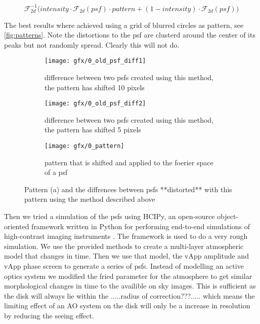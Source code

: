 \begin{equation}
\mathscr{F}_{2d}^{-1} \Big( intensity \cdot \mathscr{F}_{2d}(psf) \cdot pattern + (1-intensity) \cdot \mathscr{F}_{2d}(psf) \Big)
\end{equation}

The best results where achieved using a grid of blurred circles as pattern, see \autoref{fig:patterns}. Note the distortions to the psf are clusterd around the center of its peaks but not randomly spread. Clearly this will not do.

\begin{figure}[h!]
      \begin{subfigure}[t]{0.5\textwidth}
        \texttt{[image: gfx/0\_old\_psf\_diff1]}
        \caption{difference between two psfs created using this method, the pattern has shifted 10 pixels}
      \end{subfigure}%
      \begin{subfigure}[t]{0.5\textwidth}
        \texttt{[image: gfx/0\_old\_psf\_diff2]}
        \caption{difference between two psfs created using this method, the pattern has shifted 5 pixels}
      \end{subfigure}
      
      \begin{subfigure}[]{0.5\textwidth}
        \texttt{[image: gfx/0\_pattern]}
        \caption{pattern that is shifted and applied to the foerier space of a psf}
      \end{subfigure}
      
  \caption{Pattern (a) and the diffrences between psfs **distorted** with this pattern using the method described above}
  \label{fig:patterns}
\end{figure}

Then we tried a simulation of the psfs using HCIPy, an open-source object-oriented framework written in Python for performing end-to-end simulations of high-contrast imaging instruments \cite{hcipy}. The framework is used to do a very rough simulation. We use the provided methods to create a multi-layer atmospheric model that changes in time. Then we use that model, the vApp amplitude and vApp phase screen to generate a series of psfs. Instead of modelling an active optics system we modified the fried parameter for the atmosphere to get similar morphological changes in time to the availible on sky images. This is sufficient as the disk will always lie within the .....radius of correction???..... which means the limiting effect of an AO system on the disk will only be a increase in resolution by reducing the seeing effect.

